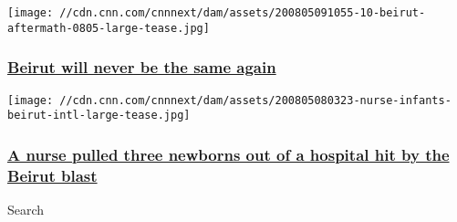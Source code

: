\href{/2020/08/05/middleeast/beirut-qiblawi-analysis-intl/index.html}{}

\texttt{[image: //cdn.cnn.com/cnnnext/dam/assets/200805091055-10-beirut-aftermath-0805-large-tease.jpg]}

\hypertarget{beirut-will-never-be-the-same-again}{%
\subsubsection{\texorpdfstring{\href{/2020/08/05/middleeast/beirut-qiblawi-analysis-intl/index.html}{Beirut
will never be the same
again}}{Beirut will never be the same again}}\label{beirut-will-never-be-the-same-again}}

\href{/2020/08/05/middleeast/beirut-nurse-newborns-hospital-intl/index.html}{}

\texttt{[image: //cdn.cnn.com/cnnnext/dam/assets/200805080323-nurse-infants-beirut-intl-large-tease.jpg]}

\hypertarget{a-nurse-pulled-three-newborns-out-of-a-hospital-hit-by-the-beirut-blast-}{%
\subsubsection{\texorpdfstring{\href{/2020/08/05/middleeast/beirut-nurse-newborns-hospital-intl/index.html}{A
nurse pulled three newborns out of a hospital hit by the Beirut blast
}}{A nurse pulled three newborns out of a hospital hit by the Beirut blast }}\label{a-nurse-pulled-three-newborns-out-of-a-hospital-hit-by-the-beirut-blast-}}

Search


